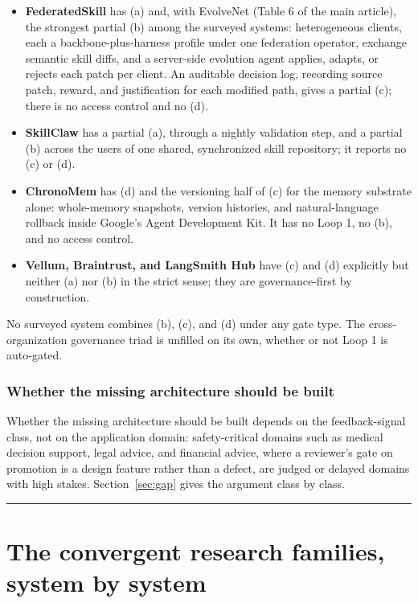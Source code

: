\documentclass[
  11pt,
]{article}
\begin{document}
\begin{itemize}
\item
  \textbf{FederatedSkill} \cite{yang2026federatedskill} has (a) and, with EvolveNet (Table 6 of the main article), the strongest partial (b) among the surveyed systems: heterogeneous clients, each a backbone-plus-harness profile under one federation operator, exchange semantic skill diffs, and a server-side evolution agent applies, adapts, or rejects each patch per client. An auditable decision log, recording source patch, reward, and justification for each modified path, gives a partial (c); there is no access control and no (d).
\item
  \textbf{SkillClaw} \cite{ma2026skillclaw} has a partial (a), through a nightly validation step, and a partial (b) across the users of one shared, synchronized skill repository; it reports no (c) or (d).
\item
  \textbf{ChronoMem} \cite{su2026chronomem} has (d) and the versioning half of (c) for the memory substrate alone: whole-memory snapshots, version histories, and natural-language rollback inside Google's Agent Development Kit. It has no Loop 1, no (b), and no access control.
\item
  \textbf{Vellum, Braintrust, and LangSmith Hub} have (c) and (d) explicitly but neither (a) nor (b) in the strict sense; they are governance-first by construction.
\end{itemize}

No surveyed system combines (b), (c), and (d) under any gate type. The cross-organization governance triad is unfilled on its own, whether or not Loop 1 is auto-gated.

\subsubsection{Whether the missing architecture should be built}\label{app:contrast-2-3}

Whether the missing architecture should be built depends on the feedback-signal class, not on the application domain: safety-critical domains such as medical decision support, legal advice, and financial advice, where a reviewer's gate on promotion is a design feature rather than a defect, are judged or delayed domains with high stakes. Section~\ref{sec:gap} gives the argument class by class.

\begin{center}\rule{0.5\linewidth}{0.5pt}\end{center}

\section{The convergent research families, system by system}\label{app:families}
\end{document}
